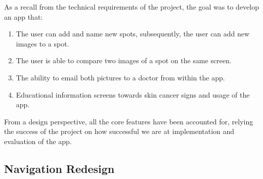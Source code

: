 As a recall from the technical requirements of the project, the goal was to develop an app that:
\begin{enumerate}
        \item The user can add and name new spots, subsequently, the user can add new images to a spot.
        \item The user is able to compare two images of a spot on the same screen.
        \item The ability to email both pictures to a doctor from within the app.
        \item Educational information screens towards skin cancer signs and usage of the app.
    \end{enumerate}
From a design perspective, all the core features have been accounted for, relying the success of the project on how successful we are at implementation and evaluation of the app.

\subsection{Navigation Redesign}
\label{nav_refactor}

